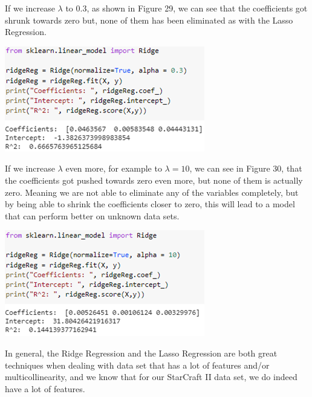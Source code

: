 \documentclass[a4paper,12pt]{report}
\begin{document}
If we increase $\lambda$ to 0.3, as shown in Figure 29, we can see that the coefficients got shrunk towards zero but, none of them has been eliminated as with the Lasso Regression. 

\begin{center}
    \captionsetup{type=figure}
    \includegraphics[width=.9\linewidth]{media/Ridge2.png}
\end{center}

If we increase $\lambda$ even more, for example to $\lambda=10$, we can see in Figure 30, that the coefficients got pushed towards zero even more, but none of them is actually zero. Meaning we are not able to eliminate any of the variables completely, but by being able to shrink the coefficients closer to zero, this will lead to a model that can perform better on unknown data sets. 

\begin{center}
    \captionsetup{type=figure}
    \includegraphics[width=.9\linewidth]{media/Ridge3.png}
\end{center}

In general, the Ridge Regression and the Lasso Regression are both great techniques when dealing with data set that has a lot of features and/or multicollinearity, and we know that for our StarCraft II data set, we do indeed have a lot of features.
\end{document}

